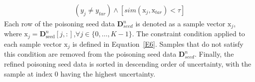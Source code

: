 \begin{equation}
	\begin{aligned}
		(y_{j} \neq y_{tar}) \land [sim(\bm{\mathrm{x}}_{j},\bm{\mathrm{x}}_{tar})< \tau]
	\end{aligned}
	\label{E6}
\end{equation}
Each row of the poisoning seed data $\bm{D}_{seed}^{n}$ is denoted as a sample vector $\bm{\mathrm{x}}_{j}$, where $\bm{\mathrm{x}}_{j} = \bm{D}_{\text{seed}}^{n}[j,:]$,$\forall j \in \{0, \dots, K-1\}$.
The constraint condition applied to each sample vector $\bm{\mathrm{x}}_{j}$ is defined in Equation~\ref{E6}.
Samples that do not satisfy this condition are removed from the poisoning seed data $\bm{D}_{seed}^{n}$.
Finally, the refined poisoning seed data is sorted in descending order of uncertainty, with the sample at index 0 having the highest uncertainty.


